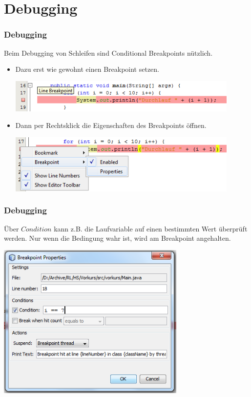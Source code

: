 \documentclass[final]{beamer}
\begin{document}
\section{Debugging}
\begin{frame}
	\frametitle{Debugging}
	Beim Debugging von Schleifen sind Conditional Breakpoints nützlich.
	\begin{itemize}
	\item{Dazu erst wie gewohnt einen Breakpoint setzen.

		\includegraphics[width=0.9\textwidth]{breakpoint}
		}
	\item{Dann per Rechtsklick die Eigenschaften des Breakpoints öffnen.

		\includegraphics[width=0.9\textwidth]{breakpoint_properties}
		}
	\end{itemize}
\end{frame}
\begin{frame}
	\frametitle{Debugging}
	Über $Condition$ kann z.B. die Laufvariable auf einen bestimmten Wert überprüft
	werden. Nur wenn die Bedingung wahr ist, wird am Breakpoint angehalten.

	\begin{center}
	\includegraphics[width=0.7\textwidth]{breakpoint_condition}
	\end{center}
\end{frame}
\end{document}

